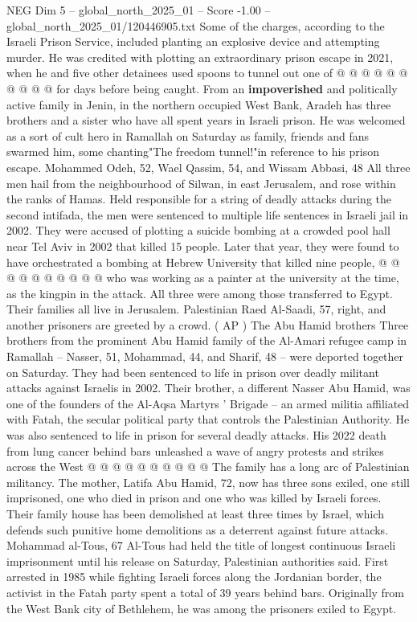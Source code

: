\begin{textsample}{NEG Dim 5 – global\_north\_2025\_01 – Score -1.00 – global\_north\_2025\_01/120446905.txt}
Some of the charges, according to the Israeli Prison Service, included planting an explosive device and attempting murder.
He was credited with plotting an extraordinary prison escape in 2021, when he and five other detainees used spoons to tunnel out one of @ @ @ @ @ @ @ @ @ @ for days before being caught.
From an \textbf{impoverished} and politically active family in Jenin, in the northern occupied West Bank, Aradeh has three brothers and a sister who have all spent years in Israeli prison.
He was welcomed as a sort of cult hero in Ramallah on Saturday as family, friends and fans swarmed him, some chanting"The freedom tunnel!"in reference to his prison escape.
Mohammed Odeh, 52, Wael Qassim, 54, and Wissam Abbasi, 48 All three men hail from the neighbourhood of Silwan, in east Jerusalem, and rose within the ranks of Hamas.
Held responsible for a string of deadly attacks during the second intifada, the men were sentenced to multiple life sentences in Israeli jail in 2002.
They were accused of plotting a suicide bombing at a crowded pool hall near Tel Aviv in 2002 that killed 15 people.
Later that year, they were found to have orchestrated a bombing at Hebrew University that killed nine people, @ @ @ @ @ @ @ @ @ @ who was working as a painter at the university at the time, as the kingpin in the attack.
All three were among those transferred to Egypt.
Their families all live in Jerusalem.
Palestinian Raed Al-Saadi, 57, right, and another prisoners are greeted by a crowd. ( AP ) The Abu Hamid brothers Three brothers from the prominent Abu Hamid family of the Al-Amari refugee camp in Ramallah -- Nasser, 51, Mohammad, 44, and Sharif, 48 -- were deported together on Saturday.
They had been sentenced to life in prison over deadly militant attacks against Israelis in 2002.
Their brother, a different Nasser Abu Hamid, was one of the founders of the Al-Aqsa Martyrs ' Brigade -- an armed militia affiliated with Fatah, the secular political party that controls the Palestinian Authority.
He was also sentenced to life in prison for several deadly attacks.
His 2022 death from lung cancer behind bars unleashed a wave of angry protests and strikes across the West @ @ @ @ @ @ @ @ @ @ The family has a long arc of Palestinian militancy.
The mother, Latifa Abu Hamid, 72, now has three sons exiled, one still imprisoned, one who died in prison and one who was killed by Israeli forces.
Their family house has been demolished at least three times by Israel, which defends such punitive home demolitions as a deterrent against future attacks.
Mohammad al-Tous, 67 Al-Tous had held the title of longest continuous Israeli imprisonment until his release on Saturday, Palestinian authorities said.
First arrested in 1985 while fighting Israeli forces along the Jordanian border, the activist in the Fatah party spent a total of 39 years behind bars.
Originally from the West Bank city of Bethlehem, he was among the prisoners exiled to Egypt.

\end{textsample}
